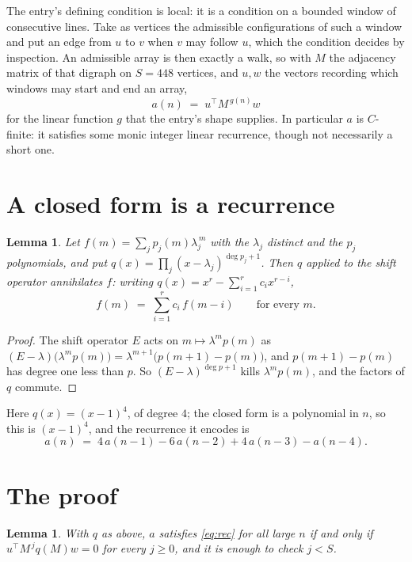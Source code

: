 \documentclass[11pt,a4paper]{article}
\theoremstyle{plain}
\newtheorem{lemma}[theorem]{Lemma}
\theoremstyle{definition}
\begin{document}
The entry's defining condition is local: it is a condition on a bounded window of consecutive lines. Take as vertices the
admissible configurations of such a window and put an edge from $u$ to $v$ when $v$ may
follow $u$, which the condition decides by inspection. An admissible array is then exactly a
walk, so with $M$ the adjacency matrix of that digraph on $S=448$ vertices, and $u,w$ the
vectors recording which windows may start and end an array,
\[
a(n)\;=\;u^{\!\top}M^{\,g(n)}w
\]
for the linear function $g$ that the entry's shape supplies. In particular $a$ is
$C$-finite: it satisfies some monic integer linear recurrence, though not necessarily a short
one.

\section{A closed form is a recurrence}

\begin{lemma}\label{lem:ann}
Let $f(m)=\sum_{j}p_j(m)\lambda_j^{\,m}$ with the $\lambda_j$ distinct and the $p_j$
polynomials, and put $q(x)=\prod_j(x-\lambda_j)^{\deg p_j+1}$. Then $q$ applied to the shift
operator annihilates $f$: writing $q(x)=x^{r}-\sum_{i=1}^{r}c_ix^{r-i}$,
\[
f(m)\;=\;\sum_{i=1}^{r}c_i\,f(m-i)\qquad\text{for every }m.
\]
\end{lemma}

\begin{proof}
The shift operator $E$ acts on $m\mapsto\lambda^{m}p(m)$ as
$(E-\lambda)\bigl(\lambda^{m}p(m)\bigr)=\lambda^{m+1}\bigl(p(m+1)-p(m)\bigr)$, and
$p(m+1)-p(m)$ has degree one less than $p$. So $(E-\lambda)^{\deg p+1}$ kills
$\lambda^{m}p(m)$, and the factors of $q$ commute.
\end{proof}

Here $q(x)=(x-1)^{4}$, of degree $4$; the closed form is a polynomial in $n$, so this is $(x-1)^{4}$, and the recurrence it encodes is
\begin{equation}\label{eq:rec}
a(n)\;=\;4\,a(n-1) - 6\,a(n-2) + 4\,a(n-3) - a(n-4).
\end{equation}

\section{The proof}

\begin{lemma}\label{lem:crit}
With $q$ as above, $a$ satisfies \eqref{eq:rec} for all large $n$ if and only if
$u^{\!\top}M^{\,j}q(M)w=0$ for every $j\ge0$, and it is enough to check $j<S$.
\end{lemma}
\end{document}
